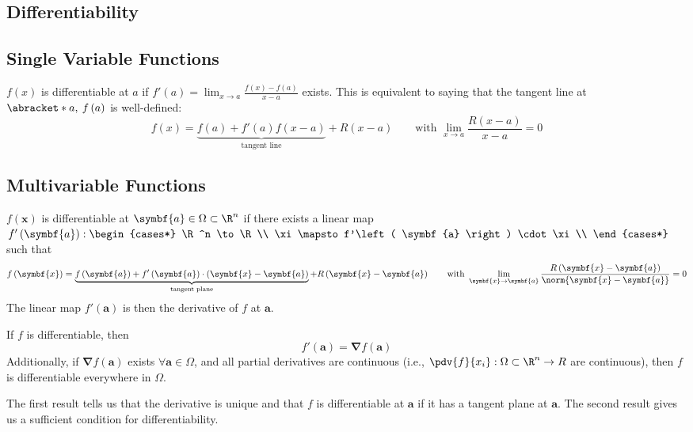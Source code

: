 \documentclass{article}
\begin{document}
\subsection{Differentiability}
\subsection{Single Variable Functions}
\(f\left( x \right)\) is differentiable at \(a\) if \(f'\left( a \right) = \lim_{x \to a} \frac{f\left( x \right) - f\left( a \right)}{x - a}\) exists.
This is equivalent to saying that the tangent line at \(\abracket*{a,\: f\left( a \right)}\) is well-defined:
\begin{equation*}
    f\left( x \right) = \underbrace{f\left( a \right) + f'\left( a \right) f\left( x - a \right)}_{\text{tangent line}} + R\left( x - a \right) \qquad \text{with } \lim_{x \to a} \frac{R\left( x - a \right)}{x - a} = 0
\end{equation*}
\subsection{Multivariable Functions}
\(f\left( \symbf{x} \right)\) is differentiable at \(\symbf{a} \in \Omega \subset \R^n\) if there exists a linear map \(f'\left( \symbf{a} \right) :
\begin{cases*}
    \R^n \to \R                                      \\
    \xi \mapsto f'\left( \symbf{a} \right) \cdot \xi \\
\end{cases*}
\) such that
\begin{equation*}
    f\left( \symbf{x} \right) = \underbrace{f\left( \symbf{a} \right) + f'\left( \symbf{a} \right) \cdot \left( \symbf{x} - \symbf{a} \right)}_{\text{tangent plane}} + R\left( \symbf{x} - \symbf{a} \right) \qquad \text{with } \lim_{\symbf{x} \to \symbf{a}} \frac{R\left( \symbf{x} - \symbf{a} \right)}{\norm{\symbf{x} - \symbf{a}}} = 0
\end{equation*}
The linear map \(f'\left( \symbf{a} \right)\) is then the derivative of \(f\) at \(\symbf{a}\).
\begin{theorem}
    If \(f\) is differentiable, then
    \begin{equation*}
        f'\left( \symbf{a} \right) = \symbf{\nabla} f\left( \symbf{a} \right)
    \end{equation*}
    Additionally, if \(\symbf{\nabla} f\left( \symbf{a} \right)\) exists
    \(\forall \symbf{a} \in \Omega\), and all partial derivatives are
    continuous (i.e., \(\pdv{f}{x_i} : \Omega \subset \R^n \to R\) are
    continuous), then \(f\) is differentiable everywhere in \(\Omega\).
\end{theorem}
The first result tells us that the derivative is unique and that \(f\) is
differentiable at \(\symbf{a}\) if it has a tangent plane at \(\symbf{a}\).
The second result gives us a sufficient condition for differentiability.
\end{document}
